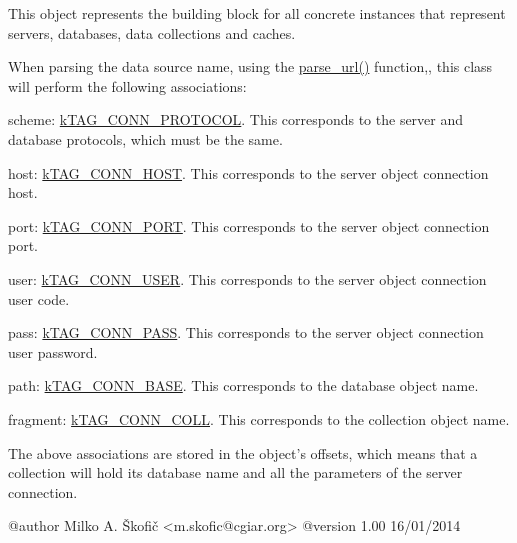 This object represents the building block for all concrete instances that represent servers, databases, data collections and caches.
\begin{DoxyItemize}
\item 
\item When parsing the data source name, using the \hyperlink{}{parse\-\_\-url()} function,, this class will perform the following associations\-:


\begin{DoxyItemize}
\item {\ttfamily scheme}\-: {\ttfamily \hyperlink{}{k\-T\-A\-G\-\_\-\-C\-O\-N\-N\-\_\-\-P\-R\-O\-T\-O\-C\-O\-L}}. This corresponds to the server and database protocols, which must be the same. 
\item {\ttfamily host}\-: {\ttfamily \hyperlink{}{k\-T\-A\-G\-\_\-\-C\-O\-N\-N\-\_\-\-H\-O\-S\-T}}. This corresponds to the server object connection host. 
\item {\ttfamily port}\-: {\ttfamily \hyperlink{}{k\-T\-A\-G\-\_\-\-C\-O\-N\-N\-\_\-\-P\-O\-R\-T}}. This corresponds to the server object connection port. 
\item {\ttfamily user}\-: {\ttfamily \hyperlink{}{k\-T\-A\-G\-\_\-\-C\-O\-N\-N\-\_\-\-U\-S\-E\-R}}. This corresponds to the server object connection user code. 
\item {\ttfamily pass}\-: {\ttfamily \hyperlink{}{k\-T\-A\-G\-\_\-\-C\-O\-N\-N\-\_\-\-P\-A\-S\-S}}. This corresponds to the server object connection user password. 
\item {\ttfamily path}\-: {\ttfamily \hyperlink{}{k\-T\-A\-G\-\_\-\-C\-O\-N\-N\-\_\-\-B\-A\-S\-E}}. This corresponds to the database object name. 
\item {\ttfamily fragment}\-: {\ttfamily \hyperlink{}{k\-T\-A\-G\-\_\-\-C\-O\-N\-N\-\_\-\-C\-O\-L\-L}}. This corresponds to the collection object name. 
\end{DoxyItemize}

The above associations are stored in the object's offsets, which means that a collection will hold its database name and all the parameters of the server connection. \begin{DoxyVerb}  @author         Milko A. Škofič <m.skofic@cgiar.org>
  @version        1.00 16/01/2014\end{DoxyVerb}
 
\end{DoxyItemize}

